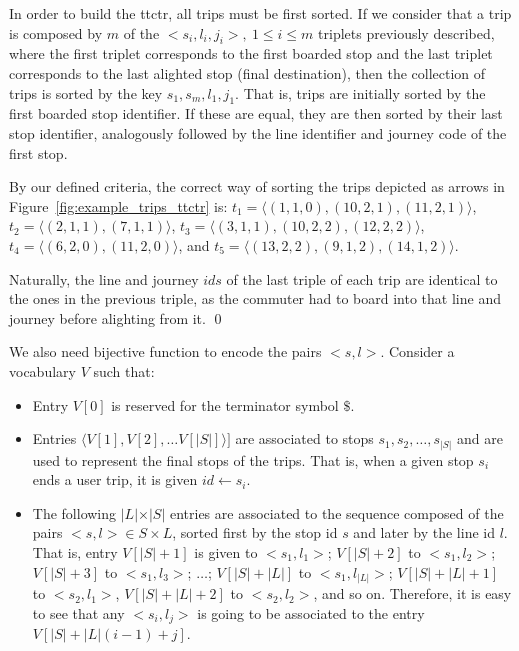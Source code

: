     In order to build the \gls{ttctr}, all trips must be first sorted. If we consider that a trip is composed by $m$ of the $<s_i,l_i,j_i>,~1\leq i\leq m$ triplets previously described, where the first triplet corresponds to the first boarded stop and the last triplet corresponds to the last alighted stop (final destination), then the collection of trips is sorted by the key $s_1,s_m,l_1,j_1$. That is, trips are initially sorted by the first boarded stop identifier. If these are equal, they are then sorted by their last stop identifier, analogously followed by the line identifier and journey code of the first stop. 
    
    \begin{example}
    	By our defined criteria, the correct way of sorting the trips depicted as arrows in Figure~\ref{fig:example_trips_ttctr} is: 
    	$t_1 = \langle (1,1,0), (10,2,1), (11,2,1)  \rangle$, 
    	$t_2 = \langle (2,1,1), (7,1,1) \rangle$, 
    	$t_3 = \langle (3,1,1), (10,2,2), (12,2,2) \rangle$, 
    	$t_4 = \langle (6,2,0),(11,2,0) \rangle$, and %
    	$t_5 = \langle (13,2,2), (9,1,2), (14,1,2) \rangle$.  
    	
    	Naturally, the line and journey $ids$ of the last triple of each trip are identical to the ones in the previous triple, as the commuter had to board into that line and journey before alighting from it.
    	\qed	\label{ex:trips}
    \end{example}
    
    We also need bijective function to encode the pairs $<s,l>$. Consider a vocabulary $V$ such that:
    \begin{itemize}
    	\item Entry $V[0]$ is reserved for the terminator symbol $\$$.
    	\item Entries $\langle V[1],V[2], \dots V[|S|]\rangle]$ are associated to stops $s_1,s_2,\dots, s_{|S|}$ and are used to represent the final stops of the trips. That is, when a given stop $s_i$ ends a user trip, it is given $id \leftarrow s_i$.
    	\item The following $|L|$$\times$$|S|$ entries are associated to the sequence composed of the pairs $<s,l> \in S\times L$, sorted first by the stop id $s$ and later by the line id $l$. That is, entry $V[|S|+1]$ is given to $<s_1,l_1>$; $V[|S|+2]$ to $<s_1,l_2>$; $V[|S|+3]$ to $<s_1,l_3>$; $\dots$; $V[|S|+|L|]$ to $<s_1,l_{|L|}>$;  $V[|S|+|L|+1]$ to $<s_2, l_1>$, $V[|S|+|L|+2]$ to $<s_2, l_2>$, and so on. Therefore, it is easy to see that any $<s_i,l_j>$ is going to be associated to the entry $V[|S|+ |L|(i-1) + j]$.
    \end{itemize}
    
